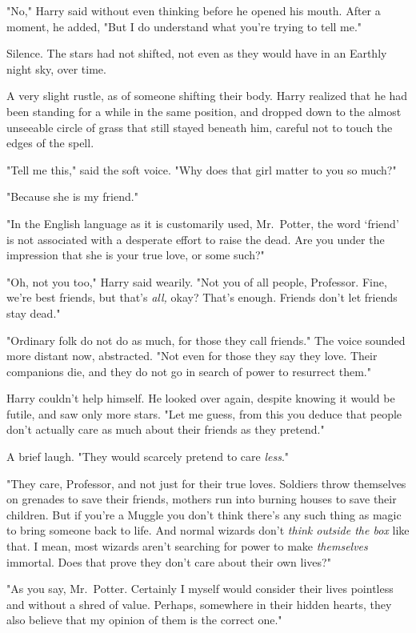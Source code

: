 "No," Harry said without even thinking before he opened his mouth. After a
moment, he added, "But I do understand what you're trying to tell me."

Silence. The stars had not shifted, not even as they would have in an Earthly
night sky, over time.

A very slight rustle, as of someone shifting their body. Harry realized that he
had been standing for a while in the same position, and dropped down to the
almost unseeable circle of grass that still stayed beneath him, careful not to
touch the edges of the spell.

"Tell me this," said the soft voice. "Why does that girl matter to you so much?"

"Because she is my friend."

"In the English language as it is customarily used, Mr.~Potter, the word
`friend' is not associated with a desperate effort to raise the dead. Are you
under the impression that she is your true love, or some such?"

"Oh, not you too," Harry said wearily. "Not you of all people, Professor. Fine,
we're best friends, but that's \emph{all,} okay? That's enough. Friends don't
let friends stay dead."

"Ordinary folk do not do as much, for those they call friends." The voice
sounded more distant now, abstracted. "Not even for those they say they love.
Their companions die, and they do not go in search of power to resurrect them."

Harry couldn't help himself. He looked over again, despite knowing it would be
futile, and saw only more stars. "Let me guess, from this you deduce
that{\el} people don't actually care as much about their friends as they
pretend."

A brief laugh. "They would scarcely pretend to care \emph{less}."

"They care, Professor, and not just for their true loves. Soldiers throw
themselves on grenades to save their friends, mothers run into burning houses
to save their children. But if you're a Muggle you don't think there's any such
thing as magic to bring someone back to life. And normal wizards don't{\el}
\emph{think outside the box} like that. I mean, most wizards aren't searching
for power to make \emph{themselves} immortal. Does that prove they don't care
about their own lives?"

"As you say, Mr.~Potter. Certainly I myself would consider their lives
pointless and without a shred of value. Perhaps, somewhere in their hidden
hearts, they also believe that my opinion of them is the correct one."

